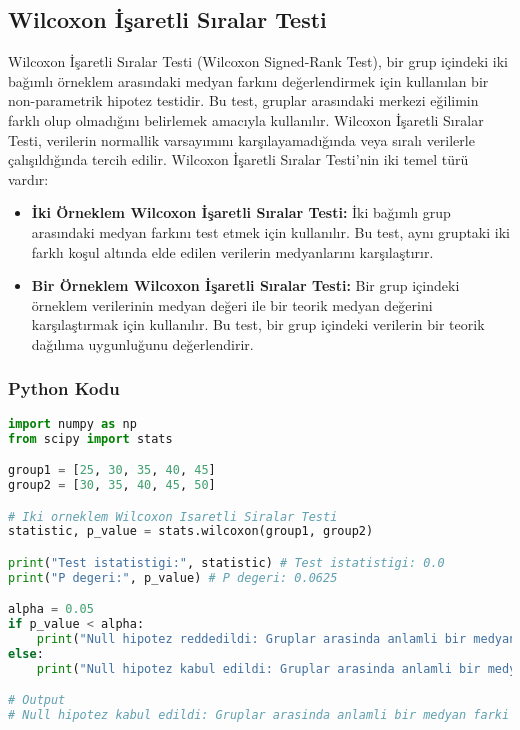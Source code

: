 \newpage

\subsection{Wilcoxon İşaretli Sıralar Testi}
Wilcoxon İşaretli Sıralar Testi (Wilcoxon Signed-Rank Test), bir grup içindeki iki bağımlı örneklem arasındaki medyan farkını değerlendirmek için kullanılan bir non-parametrik hipotez testidir. Bu test, gruplar arasındaki merkezi eğilimin farklı olup olmadığını belirlemek amacıyla kullanılır. Wilcoxon İşaretli Sıralar Testi, verilerin normallik varsayımını karşılayamadığında veya sıralı verilerle çalışıldığında tercih edilir. Wilcoxon İşaretli Sıralar Testi'nin iki temel türü vardır:

\begin{itemize}
    \item \textbf{İki Örneklem Wilcoxon İşaretli Sıralar Testi:} İki bağımlı grup arasındaki medyan farkını test etmek için kullanılır. Bu test, aynı gruptaki iki farklı koşul altında elde edilen verilerin medyanlarını karşılaştırır.
    \item \textbf{Bir Örneklem Wilcoxon İşaretli Sıralar Testi:} Bir grup içindeki örneklem verilerinin medyan değeri ile bir teorik medyan değerini karşılaştırmak için kullanılır. Bu test, bir grup içindeki verilerin bir teorik dağılıma uygunluğunu değerlendirir.
\end{itemize}

\subsubsection{Python Kodu}

\begin{lstlisting}[language=Python]
import numpy as np
from scipy import stats

group1 = [25, 30, 35, 40, 45]
group2 = [30, 35, 40, 45, 50]

# Iki orneklem Wilcoxon Isaretli Siralar Testi
statistic, p_value = stats.wilcoxon(group1, group2)

print("Test istatistigi:", statistic) # Test istatistigi: 0.0
print("P degeri:", p_value) # P degeri: 0.0625

alpha = 0.05
if p_value < alpha:
    print("Null hipotez reddedildi: Gruplar arasinda anlamli bir medyan farki vardir.")
else:
    print("Null hipotez kabul edildi: Gruplar arasinda anlamli bir medyan farki yoktur.")

# Output
# Null hipotez kabul edildi: Gruplar arasinda anlamli bir medyan farki yoktur.
\end{lstlisting}

